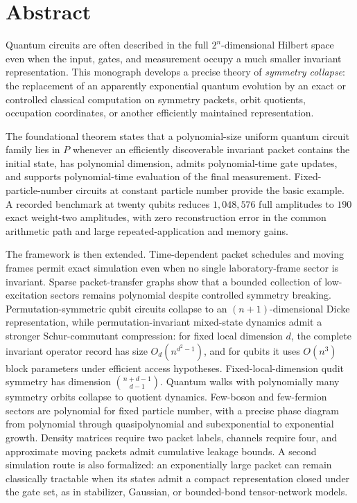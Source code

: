 \chapter*{Abstract}
Quantum circuits are often described in the full $2^n$-dimensional Hilbert space even when the input, gates, and measurement occupy a much smaller invariant representation. This monograph develops a precise theory of \emph{symmetry collapse}: the replacement of an apparently exponential quantum evolution by an exact or controlled classical computation on symmetry packets, orbit quotients, occupation coordinates, or another efficiently maintained representation.

The foundational theorem states that a polynomial-size uniform quantum circuit family lies in $P$ whenever an efficiently discoverable invariant packet contains the initial state, has polynomial dimension, admits polynomial-time gate updates, and supports polynomial-time evaluation of the final measurement. Fixed-particle-number circuits at constant particle number provide the basic example. A recorded benchmark at twenty qubits reduces $1{,}048{,}576$ full amplitudes to $190$ exact weight-two amplitudes, with zero reconstruction error in the common arithmetic path and large repeated-application and memory gains.

The framework is then extended. Time-dependent packet schedules and moving frames permit exact simulation even when no single laboratory-frame sector is invariant. Sparse packet-transfer graphs show that a bounded collection of low-excitation sectors remains polynomial despite controlled symmetry breaking. Permutation-symmetric qubit circuits collapse to an $(n+1)$-dimensional Dicke representation, while permutation-invariant mixed-state dynamics admit a stronger Schur-commutant compression: for fixed local dimension $d$, the complete invariant operator record has size $O_d(n^{d^2-1})$, and for qubits it uses $O(n^3)$ block parameters under efficient access hypotheses. Fixed-local-dimension qudit symmetry has dimension $\binom{n+d-1}{d-1}$. Quantum walks with polynomially many symmetry orbits collapse to quotient dynamics. Few-boson and few-fermion sectors are polynomial for fixed particle number, with a precise phase diagram from polynomial through quasipolynomial and subexponential to exponential growth. Density matrices require two packet labels, channels require four, and approximate moving packets admit cumulative leakage bounds. A second simulation route is also formalized: an exponentially large packet can remain classically tractable when its states admit a compact representation closed under the gate set, as in stabilizer, Gaussian, or bounded-bond tensor-network models.

